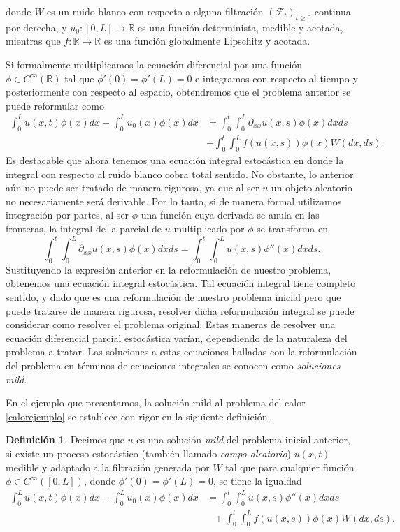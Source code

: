 \documentclass[letterpaper,twoside,12pt]{book}
\newcommand{\R}{\mathbb{R}}
\newcommand{\F}{\mathcal{F}}
\newcommand{\W}{\dot{W}}
\newcommand{\1}{\mathds{1}}
\renewcommand{\to}{\rightarrow}
\theoremstyle{definition}
\newtheorem{dfn}{Definición}
\theoremstyle{definition}
\theoremstyle{remark}
\theoremstyle{definition}
\theoremstyle{definition}
\theoremstyle{definition}
\theoremstyle{definition}
\theoremstyle{definition}
\begin{document}
donde $\W$ es un ruido blanco con respecto a alguna filtración $(\F_t)_{t\geq0}$ continua por derecha, y $u_0:[0,L]\to\R$ es una función determinista, medible y acotada, mientras que $f:\R\to\R$ es una función globalmente Lipschitz y acotada.

Si formalmente multiplicamos la ecuación diferencial por una función $\phi \in C^{\infty}(\R)$ tal que $\phi'(0)=\phi'(L)=0$ e integramos con respecto al tiempo y posteriormente con respecto al espacio, obtendremos que el problema anterior se puede reformular como 
\begin{align*}
   \int_{0}^{L}u(x,t)\phi(x)dx-\int_{0}^{L}u_0(x)\phi(x)dx&=\int_0^{t}\int_0^{L}\partial_{xx}u(x,s)\phi(x)dxds\\
   &+\int_{0}^{t}\int_{0}^{L}f(u(x,s))\phi(x)W(dx, ds).    
   \end{align*}
Es destacable que ahora tenemos una ecuación integral estocástica en donde la integral con respecto al ruido blanco cobra total sentido. No obstante, lo anterior aún no puede ser tratado de manera rigurosa, ya que al ser $u$ un objeto aleatorio no necesariamente será derivable. Por lo tanto, si de manera formal utilizamos integración por partes, al ser $\phi$ una función cuya derivada se anula en las fronteras, la integral de la parcial de $u$ multiplicado por $\phi$ se transforma en
\[
   \int_{0}^{t}\int_{0}^{L}\partial_{xx}u(x,s)\phi(x)dx ds=\int_{0}^{t}\int_{0}^{L}u(x,s)\phi''(x)dx ds.
\]
Sustituyendo la expresión anterior en la reformulación de nuestro problema, obtenemos una ecuación integral estocástica. Tal ecuación integral tiene completo sentido, y dado que es una reformulación de nuestro problema inicial pero que puede tratarse de manera rigurosa, resolver dicha reformulación integral se puede considerar como resolver el problema original. Estas maneras de resolver una ecuación diferencial parcial estocástica varían, dependiendo de la naturaleza del problema a tratar. Las soluciones a estas ecuaciones halladas con la reformulación del problema en términos de ecuaciones integrales se conocen como \textit{soluciones mild}.

En el ejemplo que presentamos, la solución mild al problema del calor \eqref{calorejemplo} se establece con rigor en la siguiente definición.

\begin{dfn} 
Decimos que $u$ es una solución \textit{mild} del problema inicial anterior, si existe un proceso estocástico (también llamado \textit{campo aleatorio}) $u(x,t)$ medible y adaptado a la filtración generada por $W$ tal que para cualquier función $\phi\in C^{\infty}([0,L])$, donde $\phi'(0)=\phi'(L)=0$, se tiene la igualdad 
\begin{align*}
   \int_{0}^{L}u(x,t)\phi(x)dx-\int_{0}^{L}u_0(x)\phi(x)dx&=\int_{0}^{t}\int_{0}^{L}u(x,s)\phi''(x)dx ds\\
   & \ \ \ +\int_{0}^{t}\int_{0}^{L}f(u(x,s))\phi(x)W(dx, ds).  
\end{align*}
\end{dfn}
\end{document}
